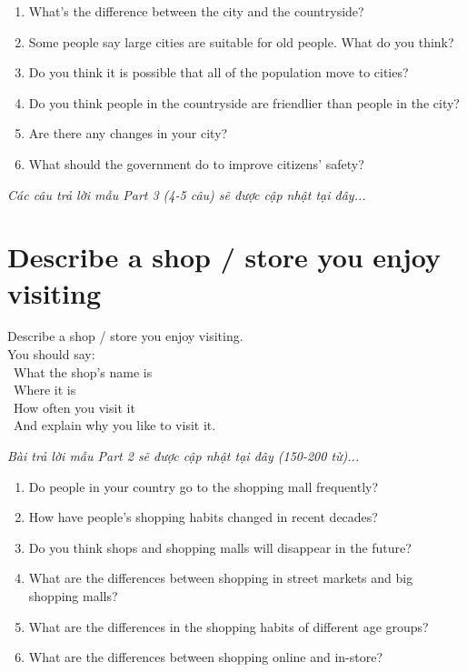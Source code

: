 \begin{ieltsprompt}
\begin{enumerate}[itemsep=4pt]
    \item What's the difference between the city and the countryside?
    \item Some people say large cities are suitable for old people. What do you think?
    \item Do you think it is possible that all of the population move to cities?
    \item Do you think people in the countryside are friendlier than people in the city?
    \item Are there any changes in your city?
    \item What should the government do to improve citizens' safety?
\end{enumerate}
\end{ieltsprompt}

\vspace{1em}
\textit{Các câu trả lời mẫu Part 3 (4-5 câu) sẽ được cập nhật tại đây...}
\vspace{2em}

\section{Describe a shop / store you enjoy visiting}
\begin{ieltsprompt}
Describe a shop / store you enjoy visiting. \\
You should say: \\
\textbullet\ What the shop's name is \\
\textbullet\ Where it is \\
\textbullet\ How often you visit it \\
\textbullet\ And explain why you like to visit it. \\
\end{ieltsprompt}

\vspace{1em}
\textit{Bài trả lời mẫu Part 2 sẽ được cập nhật tại đây (150-200 từ)...}
\vspace{2em}

\begin{ieltsprompt}
\begin{enumerate}[itemsep=4pt]
    \item Do people in your country go to the shopping mall frequently?
    \item How have people's shopping habits changed in recent decades?
    \item Do you think shops and shopping malls will disappear in the future?
    \item What are the differences between shopping in street markets and big shopping malls?
    \item What are the differences in the shopping habits of different age groups?
    \item What are the differences between shopping online and in-store?
\end{enumerate}
\end{ieltsprompt}

